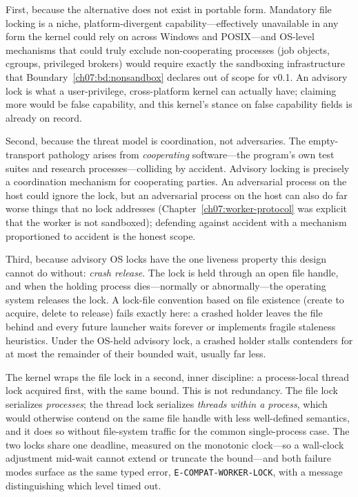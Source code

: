 First, because the alternative does not exist in portable form. Mandatory file locking is a niche, platform-divergent capability---effectively unavailable in any form the kernel could rely on across Windows and POSIX---and OS-level mechanisms that could truly exclude non-cooperating processes (job objects, cgroups, privileged brokers) would require exactly the sandboxing infrastructure that Boundary~\ref{ch07:bd:nonsandbox} declares out of scope for v0.1. An advisory lock is what a user-privilege, cross-platform kernel can actually have; claiming more would be false capability, and this kernel's stance on false capability fields is already on record.

Second, because the threat model is coordination, not adversaries. The empty-transport pathology arises from \emph{cooperating} software---the program's own test suites and research processes---colliding by accident. Advisory locking is precisely a coordination mechanism for cooperating parties. An adversarial process on the host could ignore the lock, but an adversarial process on the host can also do far worse things that no lock addresses (Chapter~\ref{ch07:worker-protocol} was explicit that the worker is not sandboxed); defending against accident with a mechanism proportioned to accident is the honest scope.

Third, because advisory OS locks have the one liveness property this design cannot do without: \emph{crash release}. The lock is held through an open file handle, and when the holding process dies---normally or abnormally---the operating system releases the lock. A lock-file convention based on file existence (create to acquire, delete to release) fails exactly here: a crashed holder leaves the file behind and every future launcher waits forever or implements fragile staleness heuristics. Under the OS-held advisory lock, a crashed holder stalls contenders for at most the remainder of their bounded wait, usually far less.

The kernel wraps the file lock in a second, inner discipline: a process-local thread lock acquired first, with the same bound. This is not redundancy. The file lock serializes \emph{processes}; the thread lock serializes \emph{threads within a process}, which would otherwise contend on the same file handle with less well-defined semantics, and it does so without file-system traffic for the common single-process case. The two locks share one deadline, measured on the monotonic clock---so a wall-clock adjustment mid-wait cannot extend or truncate the bound---and both failure modes surface as the same typed error, \texttt{E-COMPAT-WORKER-LOCK}, with a message distinguishing which level timed out.

